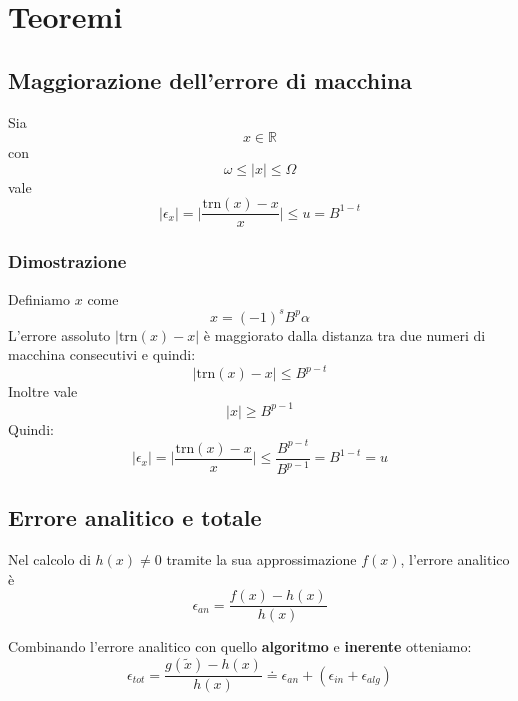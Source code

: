 \newpage
\section{Teoremi}
\subsection{Maggiorazione dell'errore di macchina}
\begin{theorem}
	Sia
	\begin{equation*}
		x \in \mathbb{R}
	\end{equation*}
	con
	\begin{equation*}
		\omega \leq \lvert x \rvert \leq \Omega
	\end{equation*}
	vale
	\begin{equation}
		\lvert \epsilon_x \rvert = \bigg\lvert \frac{\text{trn}(x) - x}{x} \bigg\rvert \leq u = B^{1-t}
	\end{equation}
\end{theorem}

\subsubsection{Dimostrazione}
Definiamo $x$ come
\begin{equation*}
	x = (-1)^s B^p \alpha
\end{equation*}
L'errore assoluto $\lvert \text{trn}(x) - x \rvert$ è maggiorato dalla distanza tra due numeri di macchina consecutivi e quindi:
\begin{equation*}
	\lvert \text{trn}(x) - x \rvert \leq B^{p-t}
\end{equation*}
Inoltre vale
\begin{equation*}
	\lvert x \rvert \geq B^{p-1}
\end{equation*}
Quindi:
\begin{equation*}
		\lvert \epsilon_x \rvert = \bigg\lvert \frac{\text{trn}(x) - x}{x} \bigg\rvert \leq \frac{B^{p-t}}{B^{p-1}} = B^{1-t} = u
\end{equation*}

\subsection{Errore analitico e totale}
\begin{definition}
	Nel calcolo di $h(x) \neq 0$ tramite la sua approssimazione $f(x)$, l'errore analitico è
	\begin{equation}
		\epsilon_{an} = \frac{f(x)-h(x)}{h(x)}
	\end{equation}
\end{definition}
\begin{definition}
	Combinando l'errore analitico con quello \textbf{algoritmo} e \textbf{inerente} otteniamo:
	\begin{equation}
		\epsilon_{tot} = \frac{g(\tilde{x}) - h(x)}{h(x)} \doteq \epsilon_{an}  + (\epsilon_{in} + \epsilon_{alg})
	\end{equation}
\end{definition}


